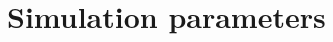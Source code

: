 \documentclass[ecp,tc,english]{iiufrgs}
\begin{document}







% 




\appendix
\chapter{Simulation parameters}\label{ap:parametros}

\end{document}
